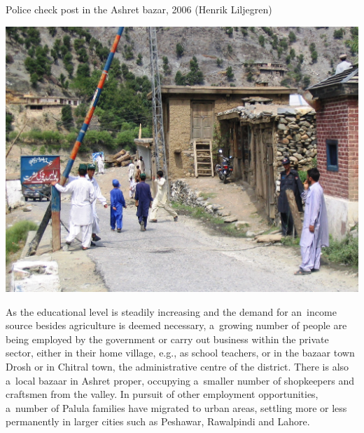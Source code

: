 \begin{photofigure}[t]
\caption{Police check post in the Ashret bazar, 2006 (Henrik Liljegren)}
\includegraphics[width=\textwidth]{photos/Photo04--CheckpostAshret.JPG}
\end{photofigure}

As the educational level is steadily increasing and the demand for an~income source besides agriculture is deemed necessary, a~growing number of people are being employed by the government or carry out business within the private sector, either in their home village, e.g., as school teachers, or in the bazaar town Drosh or in Chitral town, the administrative centre of the district. There is also a~local bazaar in Ashret proper, occupying a~smaller number of shopkeepers and craftsmen from the valley. In pursuit of other employment opportunities, a~number of Palula families have migrated to urban areas, settling more or less permanently in larger cities such as Peshawar, Rawalpindi and Lahore.
 
